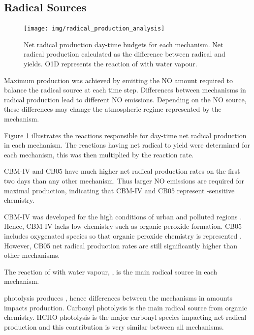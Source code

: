 \subsection{Radical Sources} \label{ss:radicals}

\begin{figure}
    \centering
    \texttt{[image: img/radical\_production\_analysis]}
    \vspace{0mm}
    \caption{Net radical production day-time budgets for each mechanism. Net radical production calculated as the difference between radical and  yields. O1D represents the reaction of  with water vapour.}
    \vspace{-4mm}
    \label{f:radical_production} 
\end{figure} 

Maximum  production was achieved by emitting the NO amount required to balance the radical source at each time step. 
Differences between mechanisms in radical production lead to different NO emissions.
Depending on the NO source, these differences may change the atmospheric regime represented by the mechanism.

Figure \ref{f:radical_production} illustrates the reactions responsible for day-time net radical production in each mechanism.
The reactions having net radical to  yield were determined for each mechanism, this was then multiplied by the reaction rate.

CBM-IV and CB05 have much higher net radical production rates on the first two days than any other mechanism.
Thus larger NO emissions are required for maximal  production, indicating that CBM-IV and CB05 represent -sensitive chemistry.

CBM-IV was developed for the high  conditions of urban and polluted regions \citep{Gery:1989}.
Hence, CBM-IV lacks low  chemistry such as organic peroxide formation.
CB05 includes oxygenated species so that organic peroxide chemistry is represented \citep{Yarwood:2005}.
However, CB05 net radical production rates are still significantly higher than other mechanisms.

The reaction of  with water vapour, , is the main radical source in each mechanism.%
\begin{reactionlist}%
\end{reactionlist}%
 photolysis produces , hence differences between the mechanisms in  amounts impacts  production.
Carbonyl photolysis is the main radical source from organic chemistry.
HCHO photolysis is the major carbonyl species impacting net radical production and this contribution is very similar between all mechanisms.

